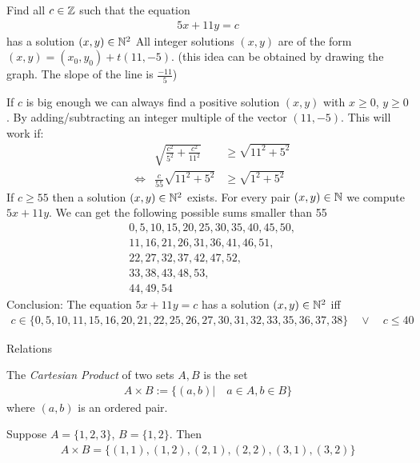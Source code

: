 \begin{ex}
Find all $c \in \mathbb Z$ such that the equation
\begin{align*}
5x+11y = c
\end{align*}
has a solution $(x,y) \in \mathbb N^2$
All integer solutions $(x,y)$ are of the form $(x,y) = (x_0,y_0) + t(11,-5)$. (this idea can be obtained by drawing the graph. The slope of the line is $\frac{-11}{5}$)

If $c$ is big enough we can always find a positive solution $(x,y)$ with $x \ge 0$, $y \ge 0$. By adding/subtracting an integer multiple of the vector $(11,-5)$. This will work if:
\begin{align*}
& & \sqrt{\frac{c^2}{5^2} + \frac{c^2}{11^2}} & \ge \sqrt{11^2 + 5^2} \\
& \Leftrightarrow & \frac c {55}  \sqrt{11^2 + 5^2} & \ge \sqrt{1^2+5^2}
\end{align*}
If $c \ge 55$ then a solution $(x, y) \in \mathbb N^2$ exists.
For every pair $(x,y) \in \mathbb N$ we compute $5x + 11y$.
We can get the following possible sums smaller than 55
\begin{align*}
& 0, 5, 10, 15, 20, 25, 30, 35, 40, 45, 50, \\
& 11, 16, 21, 26, 31, 36, 41, 46, 51, \\
& 22, 27, 32, 37, 42, 47, 52, \\
& 33, 38, 43, 48, 53, \\
& 44, 49, 54
\end{align*}
Conclusion:
The equation $5x + 11y = c$ has a solution $(x,y) \in \mathbb N^2$ iff
\begin{align*}
c \in \{0,5,10,11,15,16,20,21,22,25,26,27,30,31,32,33,35,36,37, 38 \}
\quad \vee \quad c \le 40
\end{align*}
\end{ex}

Relations

\begin{df}
The \emph{Cartesian Product} of two sets $A, B$ is the set
\begin{align*}
A \times B := \{ (a,b)| \quad a \in A, b \in B \}
\end{align*}
where $(a,b)$ is an ordered pair.
\end{df}

\begin{ex}
Suppose $A = \{1, 2, 3 \}$, $B= \{ 1,2\}$. Then 
\begin{align*}
A \times B = \{(1,1), (1,2), (2,1), (2,2), (3,1), (3,2) \}
\end{align*}
\end{ex}

